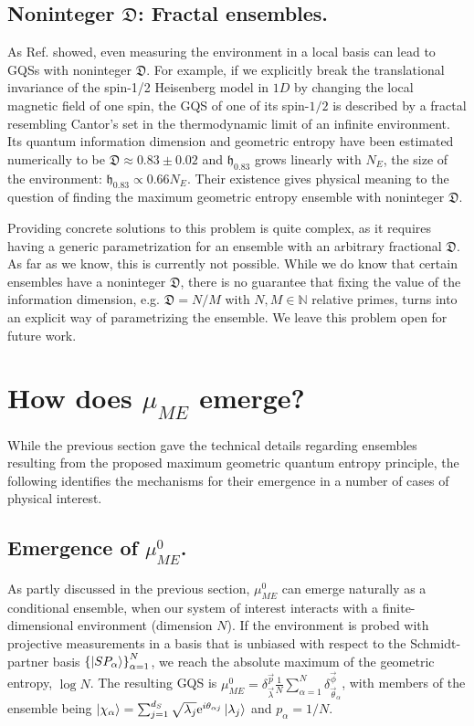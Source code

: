 \documentclass[draft,nofootinbib,pre,twocolumn,showpacs,showkeys,groupaddress,preprintnumbers,floatfix]{revtex4-1}
\newcommand{\e}{\mathrm{e}}
\newcommand{\1}{\mathbbm{1}}
\newcommand{\ID}{\mathfrak{D}}
\begin{document}
\subsection*{Noninteger $\ID$: Fractal ensembles.}

As Ref. \cite{Anza22a} showed, even measuring the environment in a local
basis can lead to GQSs with noninteger $\ID$. For example, if we explicitly
break the translational invariance of the spin-1/2 Heisenberg model in $1D$ by
changing the local magnetic field of one spin, the GQS of one of its spin-$1/2$ is described by a fractal resembling Cantor's set in the thermodynamic limit of an infinite environment. Its quantum information dimension and
geometric entropy have been estimated numerically to be $\ID \approx 0.83 \pm
0.02$ and $\mathfrak{h}_{0.83}$ grows linearly with $N_E$, the size of the
environment: $\mathfrak{h}_{0.83} \propto 0.66 N_E$. Their existence gives
physical meaning to the question of finding the maximum geometric entropy
ensemble with noninteger $\ID$. 

Providing concrete solutions to this problem is quite complex, as it requires
having a generic parametrization for an ensemble with an arbitrary fractional
$\ID$. As far as we know, this is currently not possible. While we do know that
certain ensembles have a noninteger $\ID$, there is no guarantee that fixing
the value of the information dimension, e.g. $\ID = N/M$ with $N,M \in
\mathbb{N}$ relative primes, turns into an explicit way of parametrizing the
ensemble. We leave this problem open for future work.

\section{How does $\mu_{ME}$ emerge?}
\label{sec:Discussion}

While the previous section gave the technical details regarding ensembles
resulting from the proposed maximum geometric quantum entropy principle, the
following identifies the mechanisms for their emergence in a number of cases of
physical interest.

\subsection*{Emergence of $\mu_{ME}^{0}$.}  

As partly discussed in the previous section, $\mu_{ME}^{0}$ can emerge
naturally as a conditional ensemble, when our system of interest interacts with
a finite-dimensional environment (dimension $N$). If the environment is probed
with projective measurements in a basis that is unbiased with respect to the
Schmidt-partner basis $\left\{ \ket{SP_\alpha}\right\}_{\alpha=1}^{N}$, we
reach the absolute maximum of the geometric entropy, $\log N$. The resulting
GQS is $\mu_{ME}^{0} = \delta^{\vec{p}}_{\vec{\lambda}}
\frac{1}{N}\sum_{\alpha=1}^N \delta^{\vec{\phi}}_{\vec{\theta}_\alpha}$, with
members of the ensemble being $\ket{\chi_\alpha} = \sum_{j=1}^{d_S}
\sqrt{\lambda_j} \e^{i\theta_{\alpha j}}\ket{\lambda_j}$ and $p_\alpha = 1/N$.
\end{document}
